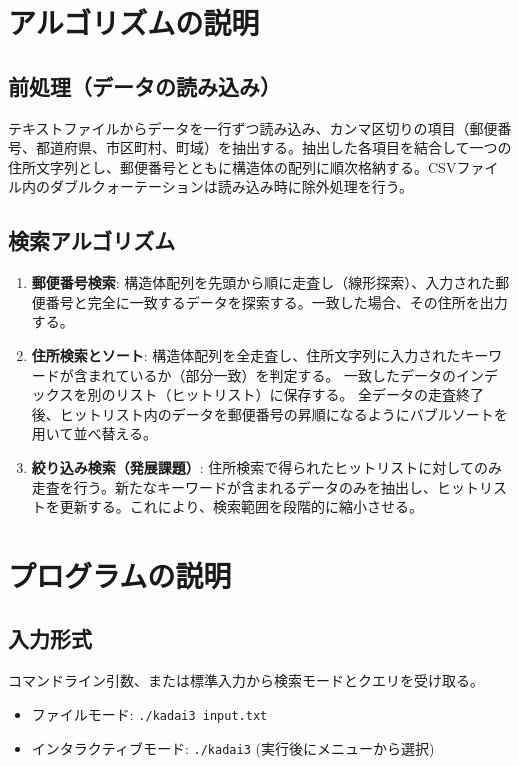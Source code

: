 \documentclass[a4paper,dvipdfmx]{jsarticle}
\begin{document}
\section{アルゴリズムの説明}
\subsection{前処理（データの読み込み）}
テキストファイルからデータを一行ずつ読み込み、カンマ区切りの項目（郵便番号、都道府県、市区町村、町域）を抽出する。抽出した各項目を結合して一つの住所文字列とし、郵便番号とともに構造体の配列に順次格納する。CSVファイル内のダブルクォーテーションは読み込み時に除外処理を行う。

\subsection{検索アルゴリズム}
\begin{enumerate}
    \item \textbf{郵便番号検索}:
    構造体配列を先頭から順に走査し（線形探索）、入力された郵便番号と完全に一致するデータを探索する。一致した場合、その住所を出力する。
    
    \item \textbf{住所検索とソート}:
    構造体配列を全走査し、住所文字列に入力されたキーワードが含まれているか（部分一致）を判定する。
    一致したデータのインデックスを別のリスト（ヒットリスト）に保存する。
    全データの走査終了後、ヒットリスト内のデータを郵便番号の昇順になるようにバブルソートを用いて並べ替える。
    
    \item \textbf{絞り込み検索（発展課題）}:
    住所検索で得られたヒットリストに対してのみ走査を行う。新たなキーワードが含まれるデータのみを抽出し、ヒットリストを更新する。これにより、検索範囲を段階的に縮小させる。
\end{enumerate}

\section{プログラムの説明}

\subsection{入力形式}
コマンドライン引数、または標準入力から検索モードとクエリを受け取る。
\begin{itemize}
    \item ファイルモード: \texttt{./kadai3 input.txt}
    \item インタラクティブモード: \texttt{./kadai3} (実行後にメニューから選択)
\end{itemize}
\end{document}
